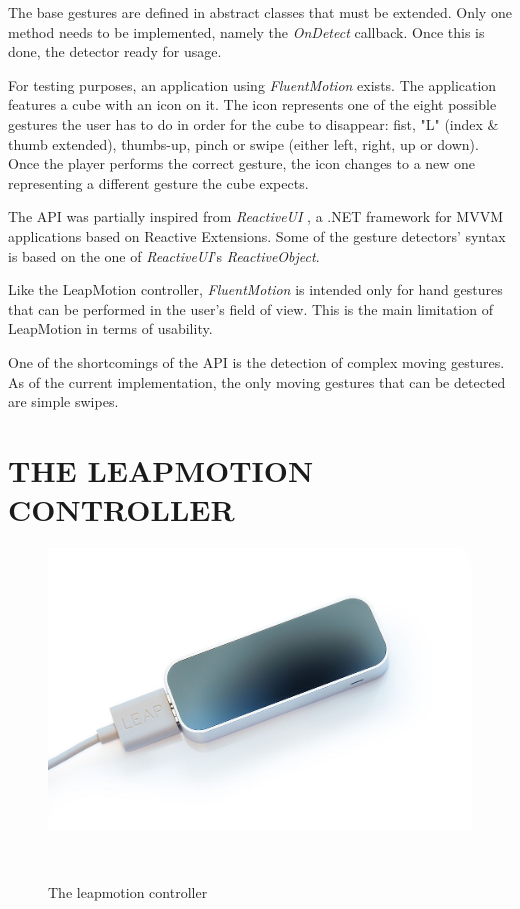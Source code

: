 \documentclass{sigchi}
\def\fluentmotion{\textit{FluentMotion}}
\def\rx{Reactive Extensions}
\def\leap{LeapMotion}
\def\reactiveui{\textit{ReactiveUI}}
\begin{document}
The base gestures are defined in abstract classes that must be extended. Only one method needs to be implemented, namely the \textit{OnDetect} callback. Once this is done, the detector ready for usage.


For testing purposes, an application using \fluentmotion{} exists. The application features a cube with an icon on it. The icon represents one of the eight possible gestures the user has to do in order for the cube to disappear: fist, "L" (index \& thumb extended), thumbs-up, pinch or swipe (either left, right, up or down). Once the player performs the correct gesture, the icon changes to a new one representing a different gesture the cube expects.


The API was partially inspired from \reactiveui{} \cite{ReactiveUI}, a .NET framework for MVVM applications based on \rx{}. Some of the gesture detectors' syntax is based on the one of \reactiveui{}'s \textit{ReactiveObject}.


Like the \leap{} controller, \fluentmotion{} is intended only for hand gestures that can be performed in the user's field of view. This is the main limitation of \leap{}  in terms of usability.


One of the shortcomings of the API is the detection of complex moving gestures. As of the current implementation, the only moving gestures that can be detected are simple swipes.


\section{THE LEAPMOTION CONTROLLER}

\begin{figure}[h]
\centering
  \includegraphics[width=0.9\columnwidth]{figures/LeapMotion_controller}
  \caption{The leapmotion controller}~\label{fig:figure1}
\end{figure}
\end{document}
